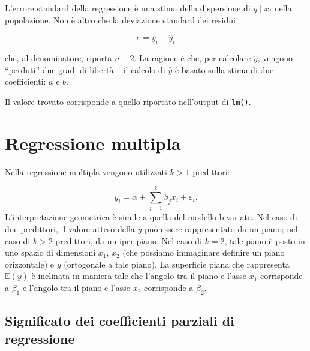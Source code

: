 \documentclass[
  11pt,
]{krantz}
\makeatletter
\newenvironment{Shaded}{\begin{snugshade}}{\end{snugshade}}
\newcommand{\CommentTok}[1]{\textcolor[rgb]{0.37,0.37,0.37}{\textit{#1}}}
\newcommand{\DecValTok}[1]{\textcolor[rgb]{0.06,0.06,0.06}{#1}}
\newcommand{\FunctionTok}[1]{\textcolor[rgb]{0,0,0}{#1}}
\newcommand{\NormalTok}[1]{#1}
\newcommand{\OtherTok}[1]{\textcolor[rgb]{0.37,0.37,0.37}{#1}}
\newcommand{\SpecialCharTok}[1]{\textcolor[rgb]{0,0,0}{#1}}
\newenvironment{kframe}{%
\medskip{}
\setlength{\fboxsep}{.8em}
 \def\at@end@of@kframe{}%
 \ifinner\ifhmode%
  \def\at@end@of@kframe{\end{minipage}}%
  \begin{minipage}{\columnwidth}%
 \fi\fi%
 \def\FrameCommand##1{\hskip\@totalleftmargin \hskip-\fboxsep
 \colorbox{shadecolor}{##1}\hskip-\fboxsep
     \hskip-\linewidth \hskip-\@totalleftmargin \hskip\columnwidth}%
 \MakeFramed {\advance\hsize-\width
   \@totalleftmargin\z@ \linewidth\hsize
   \@setminipage}}%
 {\par\unskip\endMakeFramed%
 \at@end@of@kframe}
\renewenvironment{Shaded}{\begin{kframe}}{\end{kframe}}
\theoremstyle{definition}
\theoremstyle{definition}
\theoremstyle{definition}
\theoremstyle{definition}
\theoremstyle{remark}
\makeatother
\begin{document}
L'errore standard della regressione è una stima della dispersione di \(y \mid x_i\) nella popolazione. Non è altro che la deviazione standard dei residui

\[
e = y_i - \hat{y}_i
\]

che, al denominatore, riporta \(n-2\). La ragione è che, per calcolare \(\hat{y}\), vengono ``perduti'' due gradi di libertà -- il calcolo di \(\hat{y}\) è basato sulla stima di due coefficienti: \(a\) e \(b\).

\begin{Shaded}
\end{Shaded}

Il valore trovato corrisponde a quello riportato nell'output di \texttt{lm()}.

\hypertarget{regressione-multipla}{%
\section{Regressione multipla}\label{regressione-multipla}}

Nella regressione multipla vengono utilizzati \(k > 1\) predittori:

\[
y_i = \alpha + \sum_{j=1}^k \beta_j x_i + \varepsilon_i.
\] L'interpretazione geometrica è simile a quella del modello bivariato. Nel caso di due predittori, il valore atteso della \(y\) può essere rappresentato da un piano; nel caso di \(k > 2\) predittori, da un iper-piano. Nel caso di \(k=2\), tale piano è posto in uno spazio di dimensioni \(x_1\), \(x_2\) (che possiamo immaginare definire un piano orizzontale) e \(y\) (ortogonale a tale piano). La superficie piana che rappresenta \(\mathbb{E}(y)\) è inclinata in maniera tale che l'angolo tra il piano e l'asse \(x_1\) corrisponde a \(\beta_1\) e l'angolo tra il piano e l'asse \(x_2\) corrisponde a \(\beta_2\).

\hypertarget{significato-dei-coefficienti-parziali-di-regressione}{%
\subsection{Significato dei coefficienti parziali di regressione}\label{significato-dei-coefficienti-parziali-di-regressione}}
\end{document}

